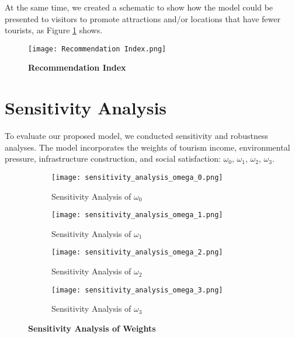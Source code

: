 \documentclass{mcmthesis}
\begin{document}
{At the same time, we created a schematic to show how the model could be presented to visitors to promote attractions and/or locations that have fewer tourists, as Figure \ref{fig:Reccommendation Index} shows.}

\begin{figure}[H]
  \small
  \centering
  \texttt{[image: Recommendation Index.png]}
  \caption{\textbf{Recommendation Index}} \label{fig:Reccommendation Index}
\end{figure}

\section{Sensitivity Analysis}
{To evaluate our proposed model, we conducted sensitivity and robustness analyses. The model incorporates the weights of tourism income, environmental pressure, infrastructure construction, and social satisfaction: $\omega_0 $, $\omega_1 $, $\omega_2 $, $\omega_3 $.}

\begin{figure}[H]
  \centering
  \begin{subfigure}[b]{0.49\textwidth}
      \texttt{[image: sensitivity\_analysis\_omega\_0.png]}
      \caption{Sensitivity Analysis of $\omega_0$}
      \label{fig:SAomega0}
  \end{subfigure}
  \hfill
  \begin{subfigure}[b]{0.49\textwidth}
      \texttt{[image: sensitivity\_analysis\_omega\_1.png]}
      \caption{Sensitivity Analysis of $\omega_1$}
      \label{fig:SAomega1}
  \end{subfigure}
  \hfill
  \begin{subfigure}[b]{0.49\textwidth}
      \texttt{[image: sensitivity\_analysis\_omega\_2.png]}
      \caption{Sensitivity Analysis of $\omega_2$}
      \label{fig:SAomega2}
  \end{subfigure}
  \hfill
  \begin{subfigure}[b]{0.49\textwidth}
      \texttt{[image: sensitivity\_analysis\_omega\_3.png]}
      \caption{Sensitivity Analysis of $\omega_3$}
      \label{fig:SAomega3}
  \end{subfigure}
  \caption{\textbf{Sensitivity Analysis of Weights}}
  \label{fig:SA}
\end{figure}
\end{document}
